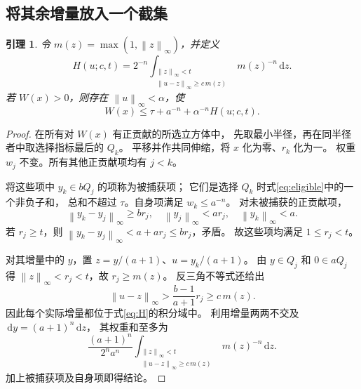 \documentclass[UTF8,a4paper,11pt,fontset=fandol]{ctexart}
\newtheorem{lemma}{引理}[section]
\theoremstyle{remark}
\newcommand{\norm}[1]{\left\lVert#1\right\rVert}
\newcommand{\dint}{\,\mathrm d}
\begin{document}
\subsection{将其余增量放入一个截集}
\begin{lemma}\label{lem:load}
令 $m(z)=\max(1,\norm z_\infty)$，并定义
\begin{equation}\label{eq:H}
 H(u;c,t)=2^{-n}
 \int_{\substack{\norm z_\infty<t\\
                  \norm{u-z}_\infty\ge c\,m(z)}}
                  m(z)^{-n}\dint z.
\end{equation}
若 $W(x)>0$，则存在 $\norm u_\infty<\alpha$，使
\begin{equation}\label{eq:load}
 W(x)\le\tau+a^{-n}+\alpha^{-n}H(u;c,t).
\end{equation}
\end{lemma}
\begin{proof}
在所有对 $W(x)$ 有正贡献的所选立方体中，
先取最小半径，再在同半径者中取选择指标最后的 $Q_k$。
平移并作共同伸缩，将 $x$ 化为零、$r_k$ 化为一。
权重 $w_j$ 不变。所有其他正贡献项均有 $j<k$。

将这些项中 $y_k\in bQ_j$ 的项称为被捕获项；
它们是选择 $Q_k$ 时式\eqref{eq:eligible}中的一个非负子和，
总和不超过 $\tau$。自身项满足 $w_k\le a^{-n}$。
对未被捕获的正贡献项，
\[
 \norm{y_k-y_j}_\infty\ge br_j,\quad
 \norm{y_j}_\infty<ar_j,\quad
 \norm{y_k}_\infty<a .
\]
若 $r_j\ge t$，则
$\norm{y_k-y_j}_\infty<a+ar_j\le br_j$，矛盾。
故这些项均满足 $1\le r_j<t$。

对其增量中的 $y$，置 $z=y/(a+1)$、$u=y_k/(a+1)$。
由 $y\in Q_j$ 和 $0\in aQ_j$ 得
$\norm z_\infty<r_j<t$，故 $r_j\ge m(z)$。
反三角不等式还给出
\[
 \norm{u-z}_\infty>
      \frac{b-1}{a+1}r_j\ge c\,m(z).
\]
因此每个实际增量都位于式\eqref{eq:H}的积分域中。
利用增量两两不交及 $\dint y=(a+1)^n\dint z$，
其权重和至多为
\[
 \frac{(a+1)^n}{2^na^n}
 \int_{\substack{\norm z_\infty<t\\
                  \norm{u-z}_\infty\ge c\,m(z)}}
                  m(z)^{-n}\dint z.
\]
加上被捕获项及自身项即得结论。
\end{proof}
\end{document}
